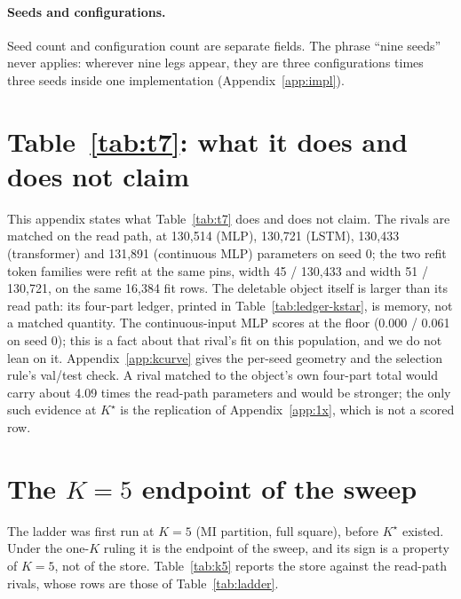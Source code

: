 \documentclass{article} %
\newcommand{\Kstar}{\ensuremath{K^{\star}}}
\begin{document}
\paragraph{Seeds and configurations.} Seed count and configuration count are separate fields. The
phrase ``nine seeds'' never applies: wherever nine legs appear, they are three configurations
times three seeds inside one implementation (Appendix~\ref{app:impl}).

\section{Table~\ref{tab:t7}: what it does and does not claim}
\label{app:t7more}
This appendix states what Table~\ref{tab:t7} does and does not claim. The rivals are matched on
the read path, at 130,514 (MLP), 130,721 (LSTM), 130,433 (transformer) and 131,891 (continuous MLP)
parameters on seed 0; the two refit token families were refit at the same pins, width 45 / 130,433 and
width 51 / 130,721, on the same 16,384 fit rows. %
The deletable object itself is larger than its read path: its four-part ledger, printed in
Table~\ref{tab:ledger-kstar}, is memory, not a matched quantity. The continuous-input MLP
scores at the floor (0.000 / 0.061 on seed 0); this is a fact about that rival's fit on this
population, and we do not lean on it. %
Appendix~\ref{app:kcurve} gives the per-seed geometry and the selection rule's val/test check.
A rival matched to the object's own four-part total would carry about 4.09 times the
read-path parameters and would be stronger; the only such evidence at $\Kstar$ is the
replication of Appendix~\ref{app:1x}, which is not a scored row. %


\section{The $K=5$ endpoint of the sweep}
\label{app:k5}

The ladder was first run at $K=5$ (MI partition, full square), before $\Kstar$ existed. Under
the one-$K$ ruling it is the endpoint of the sweep, and its sign is a property of $K=5$, not of
the store. Table~\ref{tab:k5} reports the store against the read-path rivals, whose rows are
those of Table~\ref{tab:ladder}.
\end{document}
